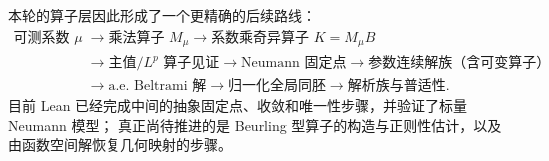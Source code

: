 \documentclass[UTF8,fontset=none,a4paper,11pt]{ctexart}
\begin{document}
本轮的算子层因此形成了一个更精确的后续路线：
\[
\begin{aligned}
\text{可测系数 }\mu
&\longrightarrow \text{乘法算子 }M_\mu
 \longrightarrow \text{系数乘奇异算子 }K=M_\mu B\\
&\longrightarrow \text{主值/\(L^p\) 算子见证}
 \longrightarrow \text{Neumann 固定点}
 \longrightarrow \text{参数连续解族（含可变算子）}\\
&\longrightarrow \text{a.e. Beltrami 解}
 \longrightarrow \text{归一化全局同胚}
 \longrightarrow \text{解析族与普适性}.
\end{aligned}
\]
目前 Lean 已经完成中间的抽象固定点、收敛和唯一性步骤，并验证了标量 Neumann 模型；
真正尚待推进的是 Beurling 型算子的构造与正则性估计，以及由函数空间解恢复几何映射的步骤。



\end{document}
